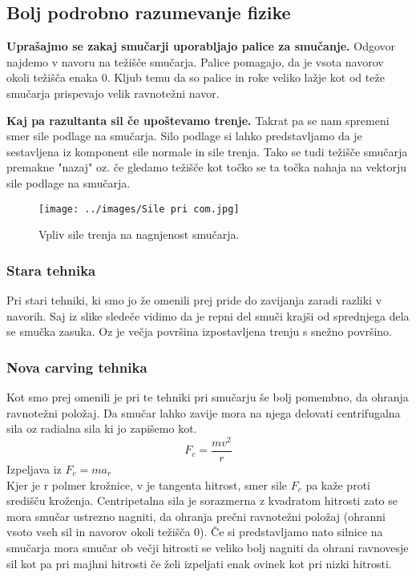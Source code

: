 \documentclass{article}
\begin{document}
\subsection{Bolj podrobno razumevanje fizike}
\textbf{Uprašajmo se zakaj smučarji uporabljajo palice za smučanje.} Odgovor najdemo v navoru na težišče smučarja.
Palice pomagajo, da je vsota navorov okoli težišča enaka 0. Kljub temu da so palice in roke veliko lažje kot
od teže smučarja prispevajo velik ravnotežni navor. \\ \newline

\textbf{Kaj pa razultanta sil če upoštevamo trenje.} Takrat pa se nam spremeni smer sile podlage na smučarja.
Silo podlage si lahko predstavljamo da je sestavljena iz komponent sile normale in sile trenja. 
Tako se tudi težišče smučarja premakne "nazaj" oz. če gledamo težišče kot točko se ta točka nahaja na vektorju
sile podlage na smučarja. \\ \newline

\begin{figure}
    \centering
    \texttt{[image: ../images/Sile pri com.jpg]} \\
    \caption[short]{Vpliv sile trenja na nagnjenost smučarja.}
\end{figure}

\subsubsection*{Stara tehnika}
Pri stari tehniki, ki smo jo že omenili prej pride do zavijanja zaradi razliki v navorih. Saj iz slike sledeče vidimo
da je repni del smuči krajši od sprednjega dela se smučka zasuka. Oz je večja površina izpostavljena trenju s snežno površino.
\subsubsection*{Nova carving tehnika}
Kot smo prej omenili je pri te tehniki pri smučarju še bolj pomembno, da ohranja ravnotežni položaj. Da smučar lahko zavije mora na njega delovati
centrifugalna sila oz radialna sila ki jo zapišemo kot.
\[F_c=\frac{mv^2}{r}\]
Izpeljava iz $ F_c=ma_r $ \\ \newline
Kjer je r polmer krožnice, v je tangenta hitrost, smer sile $ F_c $ pa kaže proti središču kroženja. Centripetalna sila je sorazmerna z kvadratom hitrosti
zato se mora smučar ustrezno nagniti, da ohranja prečni ravnotežni položaj (ohranni vsoto vseh sil in navorov okoli težišča 0).
Če si predstavljamo nato silnice na smučarja mora smučar ob večji hitrosti se veliko bolj nagniti da ohrani ravnovesje sil kot pa pri majhni hitrosti 
če želi izpeljati enak ovinek kot pri nizki hitrosti.\\ \newline 
\end{document}
